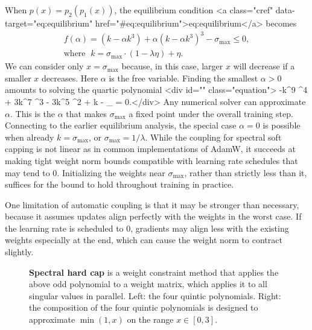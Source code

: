When $p(x) = p_2(p_1(x))$, the equilibrium condition <a class="cref" data-target="eq:equilibrium" href="#eq:equilibrium">eq:equilibrium</a> becomes \begin{gather}
    f(\alpha) = \left(k-\alpha k^{3}\right)+\alpha\left(k-\alpha k^{3}\right)^{3} - \sigma_\text{max} \leq 0, \\
    \text{where } \; k = \sigma_\text{max} \cdot (1 - \lambda \eta) + \eta.
\end{gather} We can consider only $x = \sigma_\text{max}$ because, in this case, larger $x$ will decrease if a smaller $x$ decreases. Here $\alpha$ is the free variable. Finding the smallest $\alpha > 0$ amounts to solving the quartic polynomial <div id="" class="equation">    \label{eq:generalized-coupling}
    -k^9 \alpha^4 + 3k^7 \alpha^3 - 3k^5 \alpha^2 + k - \sigma_ = 0.</div> Any numerical solver can approximate $\alpha$. This is the $\alpha$ that makes $\sigma_\text{max}$ a fixed point under the overall training step. Connecting to the earlier equilibrium analysis, the special case $\alpha = 0$ is possible when already $k = \sigma_\text{max}$, or $\sigma_\text{max} = 1/\lambda$. While the coupling for spectral soft capping is not linear as in common implementations of AdamW, it succeeds at making tight weight norm bounds compatible with learning rate schedules that may tend to $0$. Initializing the weights near $\sigma_\text{max}$, rather than strictly less than it, suffices for the bound to hold throughout training in practice.

One limitation of automatic coupling is that it may be stronger than necessary, because it assumes updates align perfectly with the weights in the worst case. If the learning rate is scheduled to $0$, gradients may align less with the existing weights especially at the end, which can cause the weight norm to contract slightly.

\begin{figure}[t]
    \centering
    \subfloat{
        
    }
    \hspace{0.03\textwidth}
    \subfloat{
        
    }
    \caption{\textbf{Spectral hard cap} is a weight constraint method that applies the above odd polynomial to a weight matrix, which applies it to all singular values in parallel. Left: the four quintic polynomials. Right: the composition of the four quintic polynomials is designed to approximate $\min(1, x)$ on the range $x \in [0, 3]$.}
    \label{fig:spectral-hard-cap-graph}
\end{figure}



